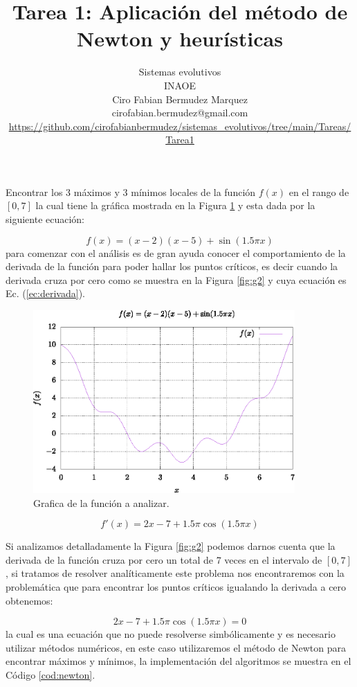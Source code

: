 \documentclass[10pt,a4paper]{article}
\author{Sistemas evolutivos\\INAOE\\Ciro Fabian Bermudez Marquez\\cirofabian.bermudez@gmail.com\\\url{https://github.com/cirofabianbermudez/sistemas_evolutivos/tree/main/Tareas/Tarea1}}
\title{Tarea 1: Aplicación del método de Newton y heurísticas}
\begin{document}
\maketitle

Encontrar los 3 máximos y 3 mínimos locales de la función $f(x)$ en el rango de $[0,7]$ la cual tiene la gráfica mostrada en la Figura \ref{fig:g1} y esta dada por la siguiente ecuación:

\begin{equation}
f(x) = (x-2)(x-5) + \sin(1.5 \pi x)
\end{equation}
para comenzar con el análisis es de gran ayuda conocer el comportamiento de la derivada de la función para poder hallar los puntos críticos, es decir cuando la derivada cruza por cero como se muestra en la Figura \ref{fig:g2} y cuya ecuación es Ec. (\ref{ec:derivada}). 

\begin{figure}[hbtp]
\centering
\includegraphics[width=10cm]{grafica1.eps}
\caption{Grafica de la función a analizar.}
\label{fig:g1}
\end{figure}

\begin{equation}
f'(x) = 2x -7 + 1.5 \pi \cos(1.5 \pi x)
\label{ec:derivada}
\end{equation}

Si analizamos detalladamente la  Figura \ref{fig:g2} podemos darnos cuenta que la derivada de la función cruza por cero un total de 7 veces en el intervalo de $[0,7]$, si tratamos de resolver analíticamente este problema nos encontraremos con la problemática que para encontrar los puntos críticos igualando la derivada a cero obtenemos:

\begin{equation}
 2x -7 + 1.5 \pi \cos(1.5 \pi x) = 0
\end{equation} 
la cual es una ecuación que no puede resolverse simbólicamente y es necesario utilizar métodos numéricos, en este caso utilizaremos el método de Newton para encontrar máximos y mínimos, la implementación del algoritmos se muestra en el Código \ref{cod:newton}.
\end{document}
